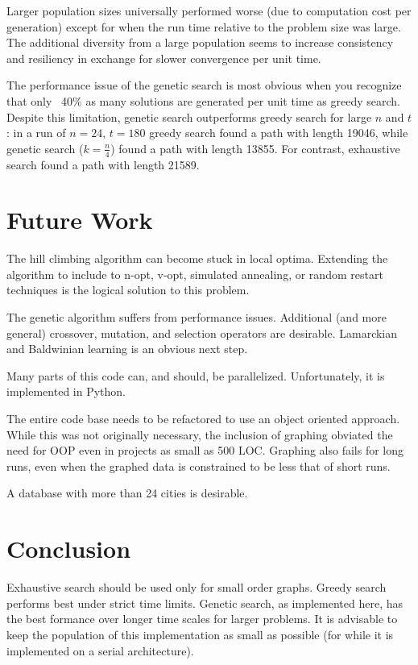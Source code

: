 \documentclass[10pt, conference, compsocconf]{IEEEtran}
\begin{document}
Larger population sizes universally performed worse (due to computation cost per generation) except for when the run time relative to the problem size was large. The additional diversity from a large population seems to increase consistency and resiliency in exchange for slower convergence per unit time.

The performance issue of the genetic search is most obvious when you recognize that only ~40\% as many solutions are generated per unit time as greedy search. Despite this limitation, genetic search outperforms greedy search for large $n$ and $t$: in a run of $n=24,\,t=180$ greedy search found a path with length 19046, while genetic search ($k=\frac{n}{4}$) found a path with length 13855. For contrast, exhaustive search found a path with length 21589.

\section{Future Work}
The hill climbing algorithm can become stuck in local optima. Extending the algorithm to include to n-opt, v-opt, simulated annealing, or random restart techniques is the logical solution to this problem.

The genetic algorithm suffers from performance issues. Additional (and more general) crossover, mutation, and selection operators are desirable. Lamarckian and Baldwinian learning is an obvious next step.

Many parts of this code can, and should, be parallelized. Unfortunately, it is implemented in Python.

The entire code base needs to be refactored to use an object oriented approach. While this was not originally necessary, the inclusion of graphing obviated the need for OOP even in projects as small as 500 LOC. Graphing also fails for long runs, even when the graphed data is constrained to be less that of short runs.

A database with more than 24 cities is desirable.

\section{Conclusion}
Exhaustive search should be used only for small order graphs. Greedy search performs best under strict time limits. Genetic search, as implemented here, has the best formance over longer time scales for larger problems. It is advisable to keep the population of this implementation as small as possible (for while it is implemented on a serial architecture).
\end{document}
